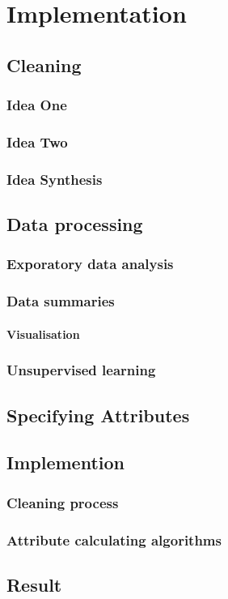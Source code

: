 \chapter{Implementation}
\section{Cleaning}
		\subsection{Idea One}
		\subsection{Idea Two}
		\subsection{Idea Synthesis}
\section{Data processing}
	\subsection{Exporatory data analysis}
		\subsection{Data summaries}
		\subsubsection{Visualisation}
	\subsection{Unsupervised learning}
\section{Specifying Attributes}
\section{Implemention}
	\subsection{Cleaning process}
	\subsection{Attribute calculating algorithms}
\section{Result}